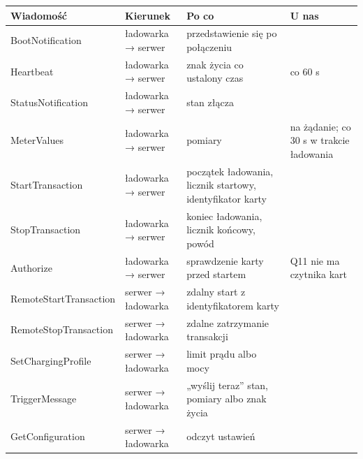 \documentclass[11pt,a4paper]{article}
\begin{document}
\begin{longtable}{>{\raggedright\arraybackslash}p{4.10cm}>{\raggedright\arraybackslash}p{3.29cm}>{\raggedright\arraybackslash}p{4.40cm}>{\raggedright\arraybackslash}p{3.05cm}}
\toprule
\rowcolor{apteallight}\textbf{Wiadomość} & \textbf{Kierunek} & \textbf{Po co} & \textbf{U nas} \\
\midrule\endhead
\bottomrule\endfoot
BootNotification & ładowarka {\symbolfont→} serwer & przedstawienie się po połączeniu & \leavevmode{\symbolfont\color{apgreen}\textbf{✔}} \\
Heartbeat & ładowarka {\symbolfont→} serwer & znak życia co ustalony czas & \leavevmode{\symbolfont\color{apgreen}\textbf{✔}} co 60 s \\
StatusNotification & ładowarka {\symbolfont→} serwer & stan złącza & \leavevmode{\symbolfont\color{apgreen}\textbf{✔}} \\
MeterValues & ładowarka {\symbolfont→} serwer & pomiary & \leavevmode{\symbolfont\color{apgreen}\textbf{✔}} na żądanie; \leavevmode{\symbolfont\color{apamber}\textbf{◐}} co 30 s w trakcie ładowania \\
StartTransaction & ładowarka {\symbolfont→} serwer & początek ładowania, licznik startowy, identyfikator karty & \leavevmode{\symbolfont\color{apamber}\textbf{◐}} \\
StopTransaction & ładowarka {\symbolfont→} serwer & koniec ładowania, licznik końcowy, powód & \leavevmode{\symbolfont\color{apamber}\textbf{◐}} \\
Authorize & ładowarka {\symbolfont→} serwer & sprawdzenie karty przed startem & \leavevmode{\symbolfont\color{apred}\textbf{✘}} Q11 nie ma czytnika kart \\
RemoteStartTransaction & serwer {\symbolfont→} ładowarka & zdalny start z identyfikatorem karty & \leavevmode{\symbolfont\color{apgreen}\textbf{✔}} \\
RemoteStopTransaction & serwer {\symbolfont→} ładowarka & zdalne zatrzymanie transakcji & \leavevmode{\symbolfont\color{apamber}\textbf{◐}} \\
SetChargingProfile & serwer {\symbolfont→} ładowarka & limit prądu albo mocy & \leavevmode{\symbolfont\color{apgreen}\textbf{✔}} \\
TriggerMessage & serwer {\symbolfont→} ładowarka & „wyślij teraz” stan, pomiary albo znak życia & \leavevmode{\symbolfont\color{apgreen}\textbf{✔}} \\
GetConfiguration & serwer {\symbolfont→} ładowarka & odczyt ustawień & \leavevmode{\symbolfont\color{apgreen}\textbf{✔}} \\

\end{longtable}
\end{document}
